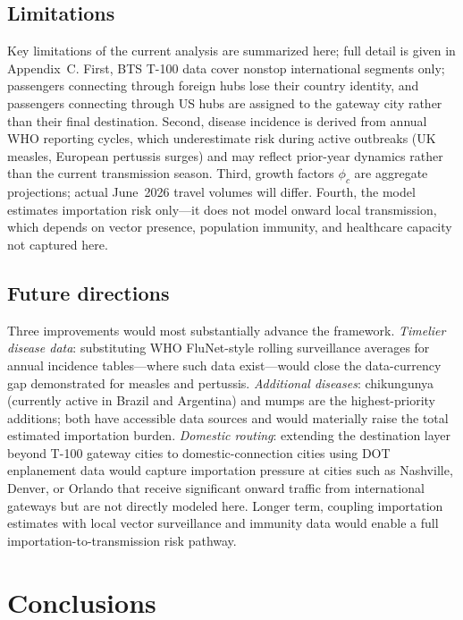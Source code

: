 \documentclass[12pt]{article}
\begin{document}
\subsection*{Limitations}

Key limitations of the current analysis are summarized here; full
detail is given in Appendix~C. First, BTS T-100 data cover nonstop
international segments only; passengers connecting through foreign
hubs lose their country identity, and passengers connecting through
US hubs are assigned to the gateway city rather than their final
destination. Second, disease incidence is derived from annual WHO
reporting cycles, which underestimate risk during active outbreaks
(UK measles, European pertussis surges) and may reflect prior-year
dynamics rather than the current transmission season. Third, growth
factors $\phi_c$ are aggregate projections; actual June~2026 travel
volumes will differ. Fourth, the model estimates importation risk
only---it does not model onward local transmission, which depends on
vector presence, population immunity, and healthcare capacity not
captured here.

\subsection*{Future directions}

Three improvements would most substantially advance the framework.
\textit{Timelier disease data}: substituting WHO FluNet-style
rolling surveillance averages for annual incidence tables---where
such data exist---would close the data-currency gap demonstrated
for measles and pertussis. \textit{Additional diseases}:
chikungunya (currently active in Brazil and Argentina) and mumps
are the highest-priority additions; both have accessible data
sources and would materially raise the total estimated importation
burden. \textit{Domestic routing}: extending the destination layer
beyond T-100 gateway cities to domestic-connection cities using
DOT enplanement data would capture importation pressure at cities
such as Nashville, Denver, or Orlando that receive significant
onward traffic from international gateways but are not directly
modeled here. Longer term, coupling importation estimates with
local vector surveillance and immunity data would enable a full
importation-to-transmission risk pathway.

\section*{Conclusions}
\end{document}
